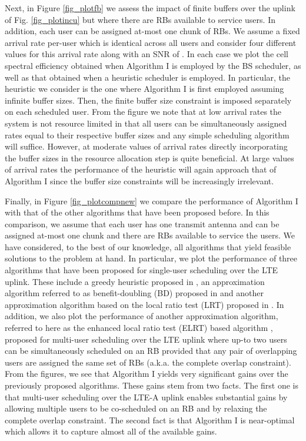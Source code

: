 \documentclass[11pt] {article}
\begin{document}
Next, in Figure \ref{fig_plotfb} we assess the impact of finite buffers over the uplink of Fig. \ref{fig_plotincu} but where there are  RBs available to service  users. In addition, each user can be assigned at-most one chunk of RBs. We assume a  fixed arrival rate per-user which is identical across all users and consider four different values for this arrival rate along with an SNR of . In each case we plot the cell spectral efficiency obtained when Algorithm I is employed by the BS scheduler, as well as that obtained when a heuristic scheduler is employed. In particular, the heuristic we consider is the one where Algorithm I is first employed assuming infinite buffer sizes. Then, the finite buffer size constraint is imposed separately on each scheduled user.
From the figure we note that at low arrival rates the system is not resource limited in that all users can be simultaneously assigned   rates equal to their respective buffer sizes and any simple scheduling algorithm will suffice. However, at moderate values of arrival rates directly incorporating the buffer sizes in the resource allocation step is quite beneficial. At large values of arrival rates the performance of the heuristic will again approach that of Algorithm I since the buffer size constraints will be increasingly irrelevant.

Finally, in Figure \ref{fig_plotcompnew} we compare the performance of Algorithm I with that of the other algorithms that have been proposed before. In this comparison, we assume that each user has one transmit antenna and can be assigned at-most one chunk and there are  RBs available to service the users. We have considered, to the best of our knowledge, all algorithms that   yield  feasible solutions to the problem at hand. In particular, we plot the performance of three algorithms that have been proposed for single-user scheduling over the LTE uplink. These include a greedy heuristic proposed in \cite{Lee-UL-2009}, an approximation algorithm referred to as benefit-doubling (BD) proposed in \cite{multiserver:2009} and another
approximation algorithm based on the local ratio test (LRT) proposed in \cite{Yang:ULinfo}. In addition, we also plot the performance of another approximation algorithm, referred to here as the enhanced local ratio test (ELRT) based algorithm \cite{prasad:wiopt12}, proposed for multi-user scheduling over the LTE uplink where up-to two users can be simultaneously scheduled on an RB provided that any pair of overlapping users are assigned the same set of RBs (a.k.a. the complete overlap constraint). From the figures, we see that Algorithm I yields very significant gains over the previously proposed algorithms. These gains stem from two facts. The first one is that multi-user scheduling over the LTE-A uplink enables substantial gains by allowing multiple users to be co-scheduled on an RB and by relaxing the complete overlap constraint. The second fact is that Algorithm I is near-optimal which allows it to capture almost all of the available gains.
\end{document}
